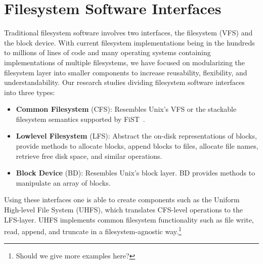 \section{Filesystem Software Interfaces}

Traditional filesystem software involves two interfaces, the
filesystem (VFS) and the block device. With current filesystem
implementations being in the hundreds to millions of lines of code and
many operating systems containing implementations of multiple
filesystems, we have focused on modularizing the filesystem layer into
smaller components to increase reusability, flexibility, and
understandability. Our research studies dividing filesystem software
interfaces into three types:

\begin{itemize}
\item \textbf{Common Filesystem} (CFS): Resembles Unix's VFS or the
  stackable filesystem semantics supported by FiST~\cite{fist}.
\item \textbf{Lowlevel Filesystem} (LFS): Abstract the on-disk
  representations of blocks, provide methods to allocate blocks,
  append blocks to files, allocate file names, retrieve free disk
  space, and similar operations.
\item \textbf{Block Device} (BD): Resembles Unix's block layer. BD
  provides methods to manipulate an array of blocks.
\end{itemize}

Using these interfaces one is able to create components such as the
Uniform High-level File System (UHFS), which translates CFS-level
operations to the LFS-layer. UHFS implements common filesystem
functionality such as file write, read, append, and truncate in a
filesystem-agnostic way.\footnote{Should we give more examples here?}
